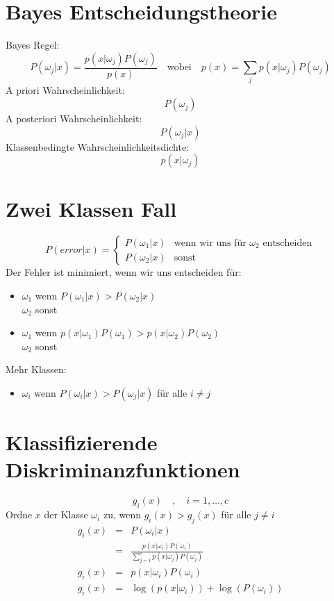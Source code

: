\section{Bayes Entscheidungstheorie}

Bayes Regel: $$P(\omega_j | x) = \frac{p(x | \omega_j) P(\omega_j)}{p(x)} \quad \textrm{wobei} \quad p(x) = \sum\limits_{j} p(x | \omega_j) P(\omega_j)$$
A priori Wahrscheinlichkeit: $$P(\omega_j)$$
A posteriori Wahrscheinlichkeit: $$P(\omega_j | x)$$
Klassenbedingte Wahrscheinlichkeitsdichte: $$p(x | \omega_j)$$

\section{Zwei Klassen Fall}

$$P(error | x) = \left\{ \begin{array}{cl} P(\omega_1 | x) & \textrm{wenn wir uns für } \omega_2 \textrm{ entscheiden} \\ P(\omega_2 | x) & \textrm{sonst} \end{array} \right.$$
Der Fehler ist minimiert, wenn wir uns entscheiden für:
\begin{itemize}
\item $\omega_1$ wenn $P(\omega_1 | x) > P(\omega_2 | x)$ \\ $\omega_2$ sonst
\item $\omega_1$ wenn $p(x | \omega_1)P(\omega_1) > p(x | \omega_2)P(\omega_2)$ \\ $\omega_2$ sonst
\end{itemize}
Mehr Klassen:
\begin{itemize}
\item $\omega_i$ wenn $P(\omega_i | x) > P(\omega_j | x)$ für alle $i \not= j$
\end{itemize}

\section{Klassifizierende Diskriminanzfunktionen}

$$g_i(x) \quad , \quad i = 1, \dots, c$$
Ordne $x$ der Klasse $\omega_i$ zu, wenn $g_i(x) > g_j(x)$ für alle $j \not= i$
\begin{eqnarray*}
g_i(x) &=& P(\omega_i | x) \\ &=& \frac{p(x | \omega_i) P(\omega_i)}{\sum\limits_{j=1}^c p(x | \omega_j)P(\omega_j)} \\ g_i(x) &=& p(x | \omega_i) P(\omega_i) \\
g_i(x) &=& \log(p(x | \omega_i)) + \log(P(\omega_i))
\end{eqnarray*}

